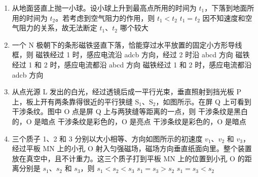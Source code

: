 \documentclass[\gkver]{gaokaozhenti}
\begin{document}
\begin{enumerate}
\item
从地面竖直上抛一小球。设小球上升到最高点所用的时间为 $t_{1}$，下落到地面所用的时间为 $t_{2}$。若考虑到空气阻力的作用，则
{$t_{1} < t_{2}$}
{$t_{1} = t_{2}$}
{因不知速度和空气阻力的关系，故无法断定 $t_{1}$、$t_{2}$ 哪个较大}

\item
一个 N 极朝下的条形磁铁竖直下落，恰能穿过水平放置的固定小方形导线框，则
{磁铁经过 1 时，感应电流沿 adcb 方向，经过 2 时沿 abcd 方向}
{磁铁经过 1 和 2 时，感应电流都沿 abcd 方向}
{磁铁经过 1 和 2 时，感应电流都沿 adcb 方向}

\item
从点光源 L 发出的白光，经过透镜后成一平行光束，垂直照射到挡光板 P 上，板上开有两条靠得很近的平行狭缝 S$_{1}$、S$_{2}$，如图所示。在屏 Q 上可看到干涉条纹。图中 O 点是屏 Q 上与两狭缝等距离的一点，则
{干涉条纹是黑白的，O 是暗点}
{干涉条纹是彩色的，O 是亮点}
{干涉条纹是彩色的，O 是暗点}

\item
三个质子 1、2 和 3 分别以大小相等、方向如图所示的初速度 $v_{1}$、$v_{2}$ 和 $v_{3}$，经过平板 MN 上的小孔 O 射入匀强磁场，磁场方向垂直纸面向里。整个装置放在真空中，且不计重力。这三个质子打到平板 MN 上的位置到小孔 O 的距离分别是 $s_{1}$、$s_{2}$ 和 $s_{3}$，则
{$s_{1} < s_{2} < s_{3}$}
{$s_{1} = s_{3} > s_{2}$}
{$s_{1} = s_{3} < s_{2}$}


\end{enumerate}
\end{document}
